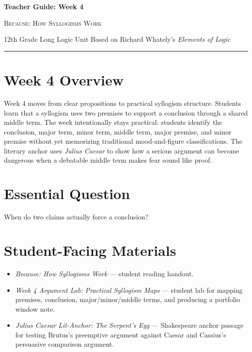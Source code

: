 \documentclass[12pt]{article}
\begin{document}
\begin{center}
{\LARGE\bfseries Teacher Guide: Week 4}\par\vspace{0.25em}
{\large\scshape Because: How Syllogisms Work}\par\vspace{0.4em}
{12th Grade Long Logic Unit Based on Richard Whately's \textit{Elements of Logic}}\par\vspace{0.6em}
\rule{0.82\textwidth}{0.4pt}
\end{center}

\section*{Week 4 Overview}
Week 4 moves from clear propositions to practical syllogism structure. Students learn that a syllogism uses two premises to support a conclusion through a shared middle term. The week intentionally stays practical: students identify the conclusion, major term, minor term, middle term, major premise, and minor premise without yet memorizing traditional mood-and-figure classifications. The literary anchor uses \textit{Julius Caesar} to show how a serious argument can become dangerous when a debatable middle term makes fear sound like proof.

\section*{Essential Question}
When do two claims actually force a conclusion?

\section*{Student-Facing Materials}
\begin{itemize}[leftmargin=*]
\item \textit{Because: How Syllogisms Work} — student reading handout.
\item \textit{Week 4 Argument Lab: Practical Syllogism Maps} — student lab for mapping premises, conclusion, major/minor/middle terms, and producing a portfolio window note.
\item \textit{Julius Caesar Lit-Anchor: The Serpent's Egg} — Shakespeare anchor passage for testing Brutus's preemptive argument against Caesar and Cassius's persuasive comparison argument.
\end{itemize}
\end{document}

